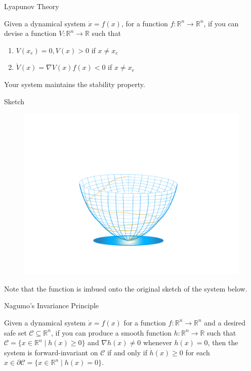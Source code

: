 \documentclass[aspectratio=169,xcolor=dvipsnames]{beamer}
\newcommand{\littlebreak}{\vspace{0.2cm}}
\begin{document}

\begin{frame}{Lyapunov Theory}
    \begin{theorem}
        Given a dynamical system $\dot{x} = f(x)$, for a function $f: \mathbb R ^n \to \mathbb R ^n$, if you can devise a function $V: \mathbb R ^n \to \mathbb R$ such that 
        \begin{enumerate}
        \item $V(x_e) = 0, V(x) > 0$ if $x \neq x_e$
        \littlebreak
        \item $\dot{V}(x) = \nabla V(x) f(x) < 0$ if $x \neq x_e$
        \end{enumerate}
        Your system maintains the stability property. 
    \end{theorem}
\end{frame}


\begin{frame}{Sketch}
    \begin{figure}
    \includegraphics[width=0.5\linewidth]{Untitled 64.png}
    \end{figure}
    Note that the function is imbued onto the original sketch of the system below.
\end{frame}


\begin{frame}{Nagumo's Invariance Principle}
    \begin{theorem}[]
        Given a dynamical system $\dot{x} = f(x)$ for a function $f: \mathbb R ^n \to \mathbb R ^n$ and a desired safe set $\mathcal C \subseteq \mathbb R ^n$, if you can produce a smooth function $h: \mathbb R ^n \to \mathbb R$ such that $\mathcal C = \{x \in \mathbb R ^n \; | \; h(x) \geq 0 \}$ and $\nabla h(x) \neq 0$ whenever $h(x) = 0$, then the system is forward-invariant on $\mathcal C$ if and only if $\dot{h} (x) \geq 0$ for each $x \in \partial \mathcal C = \{x \in \mathbb R ^n \; | \; h(x) = 0 \}$.
    \end{theorem}
\end{frame}
\end{document}
